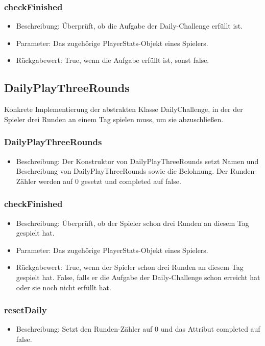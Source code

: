 \documentclass[a4paper]{scrreprt}
\begin{document}
	\subsubsection{checkFinished}
	\begin{itemize}
		\item Beschreibung: Überprüft, ob die Aufgabe der Daily-Challenge erfüllt ist.
		\item Parameter: Das zugehörige PlayerStats-Objekt eines Spielers.
		\item Rückgabewert: True, wenn die Aufgabe erfüllt ist, sonst false.
	\end{itemize}

	\subsection{DailyPlayThreeRounds}
	Konkrete Implementierung der abstrakten Klasse DailyChallenge, in der der Spieler drei Runden an einem Tag spielen muss, um sie abzuschließen.
	\subsubsection{DailyPlayThreeRounds}
	\begin{itemize}
		\item Beschreibung: Der Konstruktor von DailyPlayThreeRounds setzt Namen und Beschreibung von DailyPlayThreeRounds sowie die Belohnung. Der Runden-Zähler werden auf 0 gesetzt und completed auf false.
	\end{itemize}
	\subsubsection{checkFinished}
	\begin{itemize}
		\item Beschreibung: Überprüft, ob der Spieler schon drei Runden an diesem Tag gespielt hat.
		\item Parameter: Das zugehörige PlayerStats-Objekt eines Spielers.
		\item Rückgabewert: True, wenn der Spieler schon drei Runden an diesem Tag gespielt hat. False, falls er die Aufgabe der Daily-Challenge schon erreicht hat oder sie noch nicht erfüllt hat.
	\end{itemize}
	\subsubsection{resetDaily}
	\begin{itemize}
		\item Beschreibung: Setzt den Runden-Zähler auf 0 und das Attribut completed auf false.
	\end{itemize}
\end{document}
